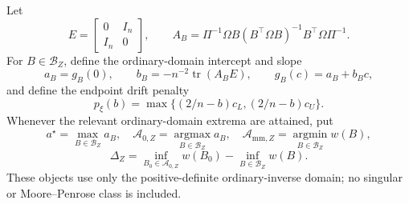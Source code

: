 Let
\[
E=\begin{bmatrix}0&I_n\\I_n&0\end{bmatrix},
\qquad
A_B=\Pi^{-1}\Omega B(B^{\top}\Omega B)^{-1}B^{\top}\Omega\Pi^{-1}.
\]
For \(B\in\mathcal B_Z\), define the ordinary-domain intercept and slope
\[
a_B=g_B(0),
\qquad
b_B=-n^{-2}\operatorname{tr}(A_BE),
\qquad g_B(c)=a_B+b_Bc,
\]
and define the endpoint drift penalty
\[
p_\xi(b)=\max\{(2/n-b)c_L,(2/n-b)c_U\}.
\]
Whenever the relevant ordinary-domain extrema are attained, put
\[
a^\star=\max_{B\in\mathcal B_Z}a_B,
\quad
\mathcal A_{0,Z}=\operatorname*{argmax}_{B\in\mathcal B_Z}a_B,
\quad
\mathcal A_{\mathrm{mm},Z}=\operatorname*{argmin}_{B\in\mathcal B_Z}w(B),
\]
\[
\Delta_Z=
\inf_{B_0\in\mathcal A_{0,Z}}w(B_0)
-\inf_{B\in\mathcal B_Z}w(B).
\]
These objects use only the positive-definite ordinary-inverse domain; no singular or Moore--Penrose class is included.